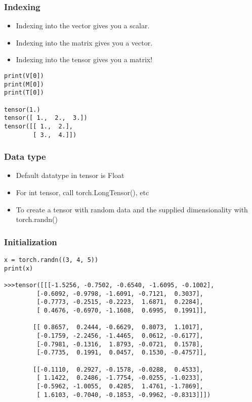 \begin{frame}[fragile]
\frametitle{Indexing}
\begin{itemize}
\item Indexing into the vector gives you a scalar. 
\item Indexing into the matrix gives you a vector. 
\item Indexing into the tensor gives you a matrix!
\end{itemize}

 \begin{lstlisting}
print(V[0])
print(M[0])
print(T[0])

tensor(1.)
tensor([ 1.,  2.,  3.])
tensor([[ 1.,  2.],
        [ 3.,  4.]])
 \end{lstlisting}

 \end{frame} 
 
 
\begin{frame}[fragile]
\frametitle{Data type}
\begin{itemize}
\item Default datatype in tensor is Float
\item For int tensor, call torch.LongTensor(), etc
\item To create a tensor with random data and the supplied dimensionality with torch.randn()
\end{itemize}

 \end{frame} 
 
\begin{frame}[fragile]
\frametitle{Initialization}
 \begin{lstlisting}
x = torch.randn((3, 4, 5))
print(x)

>>>tensor([[[-1.5256, -0.7502, -0.6540, -1.6095, -0.1002],
         [-0.6092, -0.9798, -1.6091, -0.7121,  0.3037],
         [-0.7773, -0.2515, -0.2223,  1.6871,  0.2284],
         [ 0.4676, -0.6970, -1.1608,  0.6995,  0.1991]],

        [[ 0.8657,  0.2444, -0.6629,  0.8073,  1.1017],
         [-0.1759, -2.2456, -1.4465,  0.0612, -0.6177],
         [-0.7981, -0.1316,  1.8793, -0.0721,  0.1578],
         [-0.7735,  0.1991,  0.0457,  0.1530, -0.4757]],

        [[-0.1110,  0.2927, -0.1578, -0.0288,  0.4533],
         [ 1.1422,  0.2486, -1.7754, -0.0255, -1.0233],
         [-0.5962, -1.0055,  0.4285,  1.4761, -1.7869],
         [ 1.6103, -0.7040, -0.1853, -0.9962, -0.8313]]])
 \end{lstlisting}

 \end{frame} 
 
